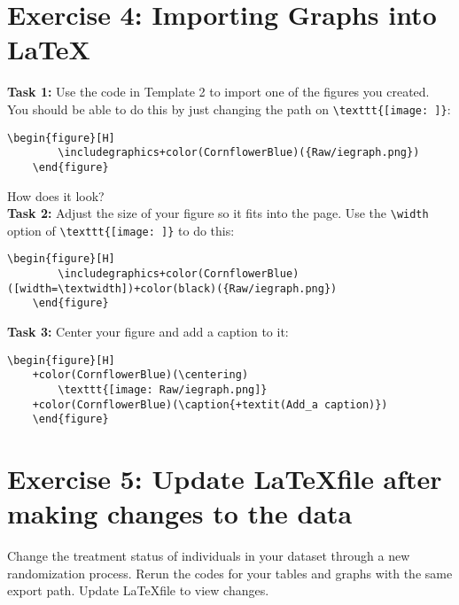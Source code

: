 \documentclass[12pts]{report}
\begin{document}
\section*{Exercise 4: Importing Graphs into \LaTeX}

\textbf{Task 1:} Use the code in Template 2 to import one of the figures you created. You should be able to do this by just changing the path on \verb|\texttt{[image: ]}|:
\begin{center}
	\begin{Verbatim}[commandchars=+\(\)]
	\begin{figure}[H]
		\includegraphics+color(CornflowerBlue)({Raw/iegraph.png})
	\end{figure}
	\end{Verbatim}
\end{center}

How does it look? \\

\textbf{Task 2:} Adjust the size of your figure so it fits into the page. Use the \verb|\width| option of \verb|\texttt{[image: ]}| to do this:
\begin{center}
	\begin{Verbatim}[commandchars=+\(\)]
	\begin{figure}[H]
		\includegraphics+color(CornflowerBlue)([width=\textwidth])+color(black)({Raw/iegraph.png})
	\end{figure}
	\end{Verbatim}
\end{center}

\textbf{Task 3:} Center your figure and add a caption to it:
\begin{center}
	\begin{Verbatim}[commandchars=+\(\)]
	\begin{figure}[H]
	+color(CornflowerBlue)(\centering)
		\texttt{[image: Raw/iegraph.png]}
	+color(CornflowerBlue)(\caption{+textit(Add_a caption)})
	\end{figure}
	\end{Verbatim}
\end{center}

\section*{Exercise 5: Update \LaTeX\space file after making changes to the data}
Change the treatment status of individuals in your dataset through a new randomization process. Rerun the codes for your tables and graphs with the same export path. Update \LaTeX file to view changes.
\end{document}

